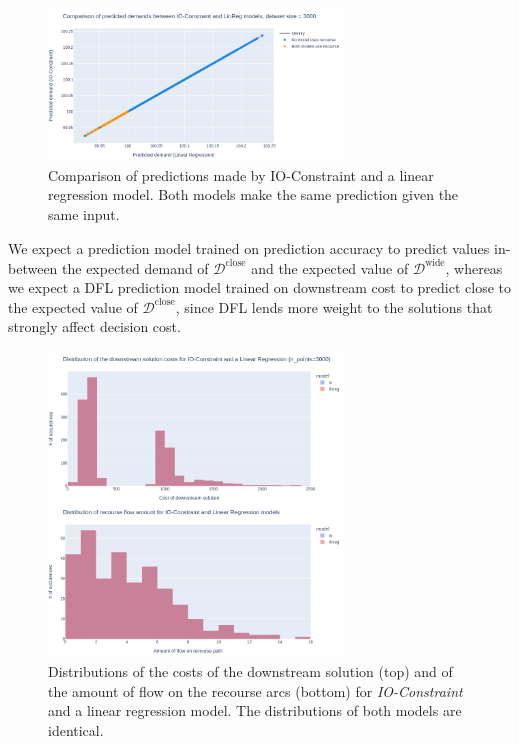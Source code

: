 \begin{figure}[h]
    \centering
    \includegraphics[width=0.7\textwidth]{res/img/pred_comparison.png}
    \caption{Comparison of predictions made by IO-Constraint and a linear regression model. Both models make the same prediction given the same input.}
    \label{fig:eval:pred-comparison}
\end{figure}

We expect a prediction model trained on prediction accuracy to predict values in-between the expected demand of $\mathcal{D}^\text{close}$ and the expected value of $\mathcal{D}^\text{wide}$, whereas we expect a DFL prediction model trained on downstream cost to predict close to the expected value of $\mathcal{D}^\text{close}$, since DFL lends more weight to the solutions that strongly affect decision cost. 

\begin{figure}[ht]
    \centering
    \includegraphics[width=0.7\textwidth]{res/img/dist_flow_costs.png}
    \caption{Distributions of the costs of the downstream solution (top) and of the amount of flow on the recourse arcs (bottom) for \textit{IO-Constraint} and a linear regression model. The distributions of both models are identical.}
    \label{fig:eval:dist-flow-costs}
\end{figure}

